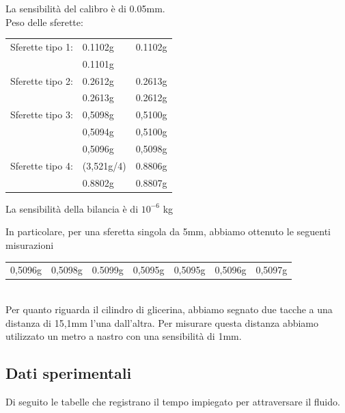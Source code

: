 \documentclass[a4paper,10pt]{report}
\begin{document}
La sensibilità del calibro è di 0.05mm.\\
Peso delle sferette:

\begin{center}
\begin{tabular}{lll}
 Sferette tipo 1:
 & 0.1102g & 0.1102g \\
 & 0.1101g & \\
 \midrule
 Sferette tipo 2: 
 & 0.2612g & 0.2613g \\
 & 0.2613g & 0.2612g \\
 \midrule
 Sferette tipo 3: 
 & 0,5098g & 0,5100g \\
 & 0,5094g & 0,5100g \\
 & 0,5096g & 0,5098g \\
 \midrule
 Sferette tipo 4:
  & (3,521g/4) & 0.8806g \\
  & 0.8802g & 0.8807g \\
\end{tabular}
\end{center}

La sensibilità della bilancia è di $10^{-6}$ kg

In particolare, per una sferetta singola da 5mm, abbiamo ottenuto le seguenti misurazioni\\
\begin{tabular}{ccccccc}
0,5096g & 0,5098g & 0.5099g & 0,5095g & 0,5095g & 0,5096g & 0,5097g
\end{tabular}
\\
Per quanto riguarda il cilindro di glicerina, abbiamo segnato due tacche a una distanza di 15,1mm l'una dall'altra.
Per misurare questa distanza abbiamo utilizzato un metro a nastro con una sensibilità di 1mm.

\subsection{Dati sperimentali}
Di seguito le tabelle che registrano il tempo impiegato per attraversare il fluido.
\end{document}
